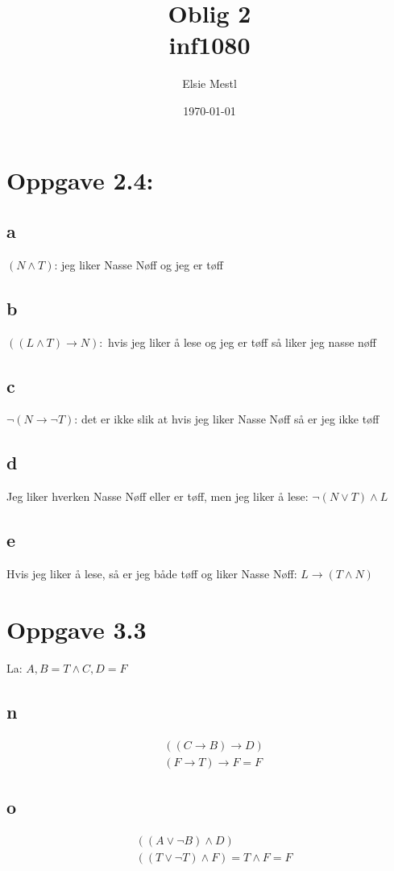 \documentclass[a4paper, norsk, 10pt]{article}
\date{\today}
\title{Oblig 2 \\ inf1080}
\author{Elsie Mestl}
\begin{document}
\maketitle
\begin{flushleft}
\section*{Oppgave 2.4:}

\subsection*{a}
 $(N \wedge T)$: \quad jeg liker Nasse Nøff og jeg er tøff

\subsection*{b}
$((L \wedge T) \rightarrow N):$ \quad  hvis jeg liker å lese og jeg er tøff så liker jeg nasse nøff

\subsection*{c}
$\neg(N \rightarrow \neg T)$: \quad det er ikke slik at hvis jeg liker Nasse Nøff så er jeg ikke tøff

\subsection*{d}
Jeg liker hverken Nasse Nøff eller er tøff, men jeg liker å lese: \quad $\neg (N \vee T) \wedge L$ %

\subsection*{e}
Hvis jeg liker å lese, så er jeg både tøff og liker Nasse Nøff: \quad $L \rightarrow (T \wedge N)$


\section*{Oppgave 3.3}
La: \quad $A,B = T \wedge C,D = F $
\subsection*{n}
\begin{align*}
&((C \rightarrow B) \rightarrow D) \\
&(F \rightarrow T) \rightarrow F = F
\end{align*}


\subsection*{o}
\begin{align*}
&((A \vee \neg B) \wedge D)\\
&((T \vee \neg T) \wedge F) = T \wedge F = F
\end{align*}  
\end{flushleft}
\end{document}

